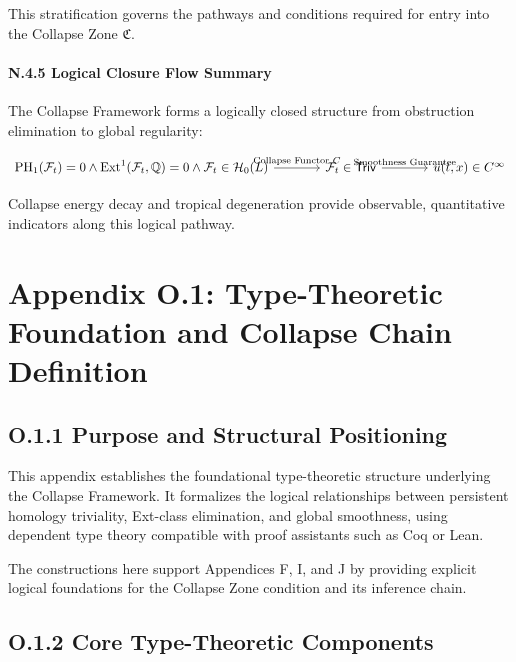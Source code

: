 \documentclass[11pt]{article}
\begin{document}
This stratification governs the pathways and conditions required for entry into the Collapse Zone $\mathfrak{C}$.

\paragraph{N.4.5 Logical Closure Flow Summary}

The Collapse Framework forms a logically closed structure from obstruction elimination to global regularity:

\[
\begin{tikzcd}[row sep=large, column sep=large]
\mathrm{PH}_1(\mathcal{F}_t) = 0 \land \mathrm{Ext}^1(\mathcal{F}_t, \mathbb{Q}) = 0 \land \mathcal{F}_t \in \mathcal{H}_0(L)
  \arrow[r, "{\text{Collapse Functor } C}"]
& \mathcal{F}_t \in \mathsf{Triv}
  \arrow[r, "{\text{Smoothness Guarantee}}"]
& u(t, x) \in C^\infty
\end{tikzcd}
\]

Collapse energy decay and tropical degeneration provide observable, quantitative indicators along this logical pathway.




\section*{Appendix O.1: Type-Theoretic Foundation and Collapse Chain Definition}

\subsection*{O.1.1 Purpose and Structural Positioning}

This appendix establishes the foundational type-theoretic structure underlying the Collapse Framework.  
It formalizes the logical relationships between persistent homology triviality, Ext-class elimination, and global smoothness, using dependent type theory compatible with proof assistants such as Coq or Lean.

The constructions here support Appendices F, I, and J by providing explicit logical foundations for the Collapse Zone condition and its inference chain.

\subsection*{O.1.2 Core Type-Theoretic Components}
\end{document}
